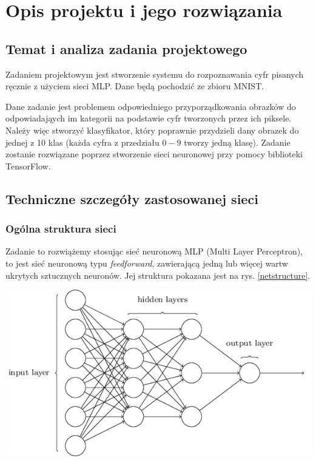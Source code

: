 \chapter{Opis projektu i jego rozwiązania}
\section{Temat i analiza zadania projektowego}

Zadaniem projektowym jest stworzenie systemu do rozpoznawania cyfr pisanych ręcznie z użyciem sieci MLP. Dane będą pochodzić ze zbioru MNIST.


Dane zadanie jest problemem odpowiedniego przyporządkowania obrazków do odpowiadająych im kategorii na podstawie cyfr tworzonych przez ich piksele. 
Należy więc stworzyć klasyfikator, który poprawnie przydzieli dany obrazek do jednej z 10 klas (każda cyfra z przedziału $0-9$ tworzy jedną klasę).
Zadanie zostanie rozwiązane poprzez stworzenie sieci neuronowej przy pomocy biblioteki TensorFlow.

\section{Techniczne szczegóły zastosowanej sieci}
\subsection{Ogólna struktura sieci}
Zadanie to rozwiążemy stosując sieć neuronową MLP (Multi Layer Perceptron), to jest sieć neuronową typu \textit{feedforward}, zawierającą jedną lub więcej wartw ukrytych sztucznych neuronów. Jej struktura pokazana jest na rys. \ref{netstructure}.
\newline
\begin{center}
	\includegraphics[width=15cm]{utils/tikz11.png}
	\label{netstructure}
\end{center}

